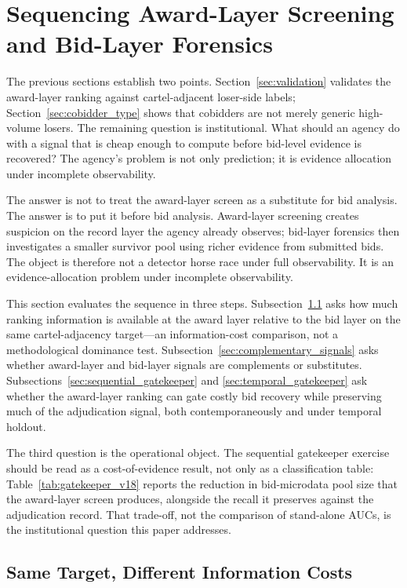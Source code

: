 \section{Sequencing Award-Layer Screening and Bid-Layer Forensics}
\label{sec:screening_forensics}

The previous sections establish two points.
Section~\ref{sec:validation} validates the award-layer ranking
against cartel-adjacent loser-side labels;
Section~\ref{sec:cobidder_type} shows that cobidders are not
merely generic high-volume losers. The remaining question is
institutional. What should an agency do with a signal that is
cheap enough to compute before bid-level evidence is recovered?
The agency's problem is not only prediction; it is evidence
allocation under incomplete observability.

The answer is not to treat the award-layer screen as a
substitute for bid analysis. The answer is to put it before bid
analysis. Award-layer screening creates suspicion on the record
layer the agency already observes; bid-layer forensics then
investigates a smaller survivor pool using richer evidence from
submitted bids. The object is therefore not a detector horse
race under full observability. It is an evidence-allocation
problem under incomplete observability.

This section evaluates the sequence in three steps.
Subsection~\ref{sec:bid_layer_benchmark} asks how much ranking
information is available at the award layer relative to the bid
layer on the same cartel-adjacency target---an
information-cost comparison, not a methodological dominance
test. Subsection~\ref{sec:complementary_signals} asks whether
award-layer and bid-layer signals are complements or
substitutes. Subsections~\ref{sec:sequential_gatekeeper} and
\ref{sec:temporal_gatekeeper} ask whether the award-layer
ranking can gate costly bid recovery while preserving much of
the adjudication signal, both contemporaneously and under
temporal holdout.

The third question is the operational object. The sequential
gatekeeper exercise should be read as a cost-of-evidence
result, not only as a classification table:
Table~\ref{tab:gatekeeper_v18} reports the reduction in
bid-microdata pool size that the award-layer screen produces,
alongside the recall it preserves against the adjudication
record. That trade-off, not the comparison of stand-alone AUCs,
is the institutional question this paper addresses.

\subsection{Same Target, Different Information Costs}
\label{sec:bid_layer_benchmark}

